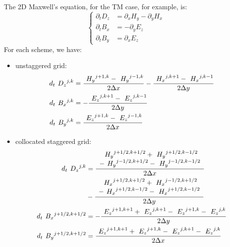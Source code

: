 The 2D Maxwell's equation, for the TM case, for example, is:
\begin{equation} \label{eqn:maxwell_2d} \left\{ \begin{aligned}
  \partial_t D_z & = \partial_x H_y - \partial_y H_x \\
  \partial_t B_x & = - \partial_y E_z \\
  \partial_t B_y & = \partial_x E_z
\end{aligned} \right. \end{equation}
For each scheme, we have:
\begin{itemize}
\item
  unstaggered grid:
  \begin{equation} \label{eqn:unstaggered} \begin{split}
  d_t {\ }^{}{D_z}^{j,k} & = \frac{{\ }^{}{H_y}^{j+1,k} -
  {\ }^{}{H_y}^{j-1,k}}{2\Delta x} - \frac{{\ }^{}{H_x}^{j,k+1} -
  {\ }^{}{H_x}^{j,k-1}}{2\Delta y} \\
  d_t {\ }^{}{B_x}^{j,k} & = - \frac{{\ }^{}{E_z}^{j,k+1} -
  {\ }^{}{E_z}^{j,k-1}}{2\Delta y} \\
  d_t {\ }^{}{B_y}^{j,k} & = \frac{{\ }^{}{E_z}^{j+1,k} -
  {\ }^{}{E_z}^{j-1,k}}{2\Delta x}
  \end{split} \end{equation}
\item
  collocated staggered grid:
  \begin{equation} \label{eqn:collocated_staggered} \begin{split}
  d_t \Disc{D_z}{j,k}{} & =
  \frac{\begin{array}{c}
      \Disc{H_y}{j+1/2,k+1/2}{} + \Disc{H_y}{j+1/2,k-1/2}{} \\
      - \Disc{H_y}{j-1/2,k+1/2}{} - \Disc{H_y}{j-1/2,k-1/2}{}
    \end{array}}{2\deltax} \\
  & - \frac{\begin{array}{c}
      \Disc{H_x}{j+1/2,k+1/2}{} + \Disc{H_x}{j-1/2,k+1/2}{} \\
      - \Disc{H_x}{j+1/2,k-1/2}{} - \Disc{H_x}{j+1/2,k-1/2}{}
  \end{array}}{2\deltay} \\
  d_t \Disc{B_x}{j+1/2,k+1/2}{} & = - \frac{\Disc{E_z}{j+1,k+1}{} +
  \Disc{E_z}{j,k+1}{} - \Disc{E_z}{j+1,k}{} -
  \Disc{E_z}{j,k}{}}{2\deltay} \\
  d_t \Disc{B_y}{j+1/2,k+1/2}{} & = \frac{\Disc{E_z}{j+1,k+1}{} +
  \Disc{E_z}{j+1,k}{} - \Disc{E_z}{j,k+1}{} -
  \Disc{E_z}{j,k}{}}{2\deltax}

\end{split}
\end{equation}
\end{itemize}
